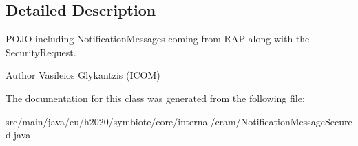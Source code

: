 \subsection{Detailed Description}
P\+O\+JO including Notification\+Messages coming from R\+AP along with the Security\+Request. \begin{DoxyAuthor}{Author}
Vasileios Glykantzis (I\+C\+OM) 
\end{DoxyAuthor}


The documentation for this class was generated from the following file\+:\begin{DoxyCompactItemize}
\item 
src/main/java/eu/h2020/symbiote/core/internal/cram/Notification\+Message\+Secured.\+java\end{DoxyCompactItemize}

